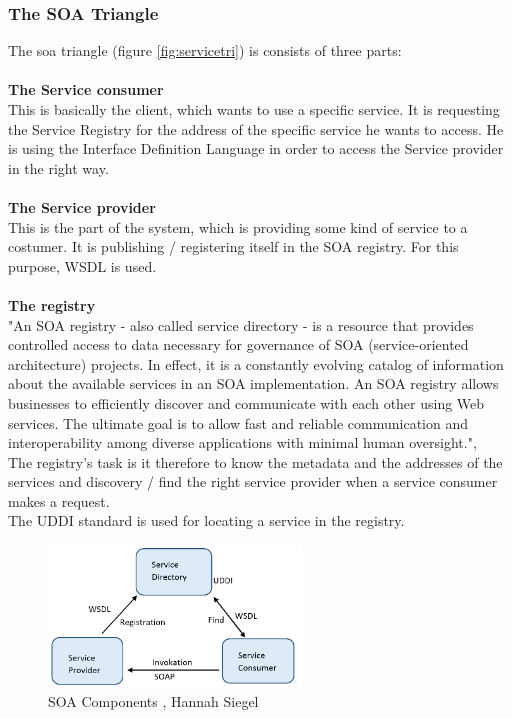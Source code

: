 \documentclass[12pt]{article}
\begin{document}
\subsubsection{The SOA Triangle} %
\label{sec:soatriangle}
The \gls{soa} triangle (figure \ref{fig:servicetri}) is consists of three parts:
\\\\\textbf{The Service consumer} \\
This is basically the client, which wants to use a specific service. It is requesting the Service Registry 	for the address of the specific service he wants to access. He is using the Interface Definition Language in order to  access the Service provider in the right way.
\\\\\textbf{The Service provider}\\ 
This is the part of the system, which is providing some kind of service to a costumer. It is publishing / registering itself in the SOA registry. For this purpose, WSDL is used.
\\\\\textbf{The registry}\\ 
"An SOA registry - also called service directory - is a resource that provides controlled access to data necessary for governance of SOA (service-oriented architecture) projects. In effect, it is a constantly evolving catalog of information about the available services in an SOA implementation. An SOA registry allows businesses to efficiently discover and communicate with each other using Web services. The ultimate goal is to allow fast and reliable communication and interoperability among diverse applications with minimal human oversight.", \cite{soareg}\\
The registry's task is it therefore to know the metadata and the addresses of the services and discovery / find the right service provider when a service consumer makes a request. \\ 
The UDDI standard is used for locating a service in the registry.
\begin{figure}[here!]
\centering
	\includegraphics[width=0.6\textwidth]{images/tri_sm}
	  \caption{SOA Components \cite{arg3,arg1}, Hannah Siegel}
    \label{fig:servicetri}
        \label{fig:comtri}

	\end{figure}
\end{document}
